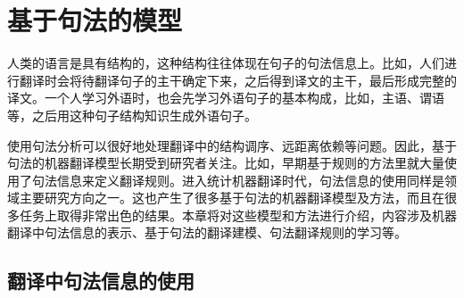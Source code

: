 
%


\renewcommand\figurename{图}%
\renewcommand\tablename{表}%


\chapter{基于句法的模型}

人类的语言是具有结构的，这种结构往往体现在句子的句法信息上。比如，人们进行翻译时会将待翻译句子的主干确定下来，之后得到译文的主干，最后形成完整的译文。一个人学习外语时，也会先学习外语句子的基本构成，比如，主语、谓语等，之后用这种句子结构知识生成外语句子。

使用句法分析可以很好地处理翻译中的结构调序、远距离依赖等问题。因此，基于句法的机器翻译模型长期受到研究者关注。比如，早期基于规则的方法里就大量使用了句法信息来定义翻译规则。进入统计机器翻译时代，句法信息的使用同样是领域主要研究方向之一。这也产生了很多基于句法的机器翻译模型及方法，而且在很多任务上取得非常出色的结果。本章将对这些模型和方法进行介绍，内容涉及机器翻译中句法信息的表示、基于句法的翻译建模、句法翻译规则的学习等。


\section{翻译中句法信息的使用}

